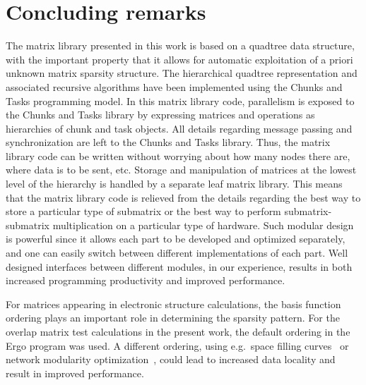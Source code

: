 \documentclass{elsarticle}
\begin{document}
 
 


\section{Concluding remarks}\label{sec:conclusions}

The matrix library presented in this work is based on a quadtree data
structure, with the important property that it allows for automatic
exploitation of a priori unknown
matrix sparsity structure.  The
hierarchical quadtree representation and associated recursive
algorithms have been implemented using the Chunks and Tasks
programming model.
In this matrix library code, parallelism is exposed to the Chunks and
Tasks library by expressing matrices and operations as hierarchies of
chunk and task objects. All details regarding message passing and
synchronization are left to the Chunks and Tasks library. Thus, the
matrix library code can be written without worrying about how many
nodes there are, where data is to be sent, etc.
Storage and manipulation of matrices at the lowest level of the
hierarchy is handled by a separate leaf matrix library. This means
that the matrix library code is relieved from the details regarding
the best way to store a particular type of submatrix 
or the best way to perform submatrix-submatrix
multiplication on a particular type of hardware.
Such modular design is powerful since it allows each part to be
developed and optimized separately, and one can easily switch between
different implementations of each part. Well designed interfaces
between different modules, in our experience, results in both
increased programming productivity and improved performance.

 

For matrices appearing in electronic structure calculations, the basis
function ordering plays an important role in determining the sparsity
pattern. For the overlap matrix test calculations in the present
work, the default ordering in the {\sc Ergo} program was used.
A different ordering, using e.g.~space filling
curves~\cite{Challacombe-sparsematrix} or network modularity
optimization~\cite{Girvan11062002-network,rubensson-inverse-factorization},
could lead to increased data locality and result in improved
performance.
\end{document}
